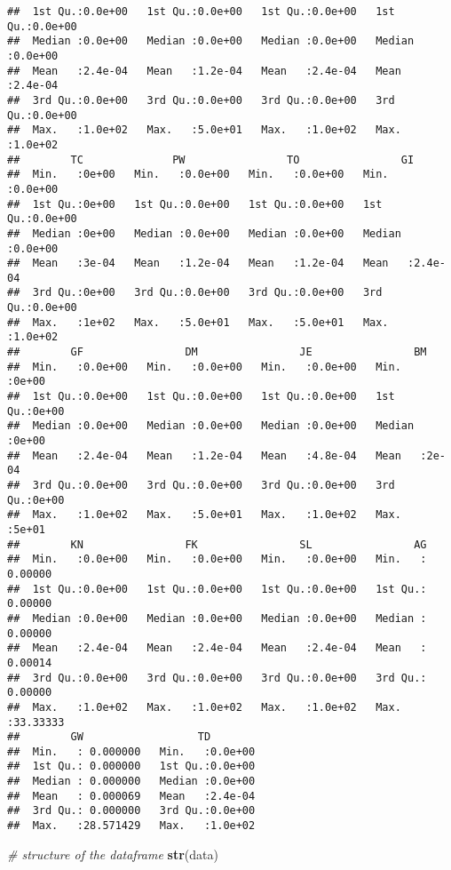 \documentclass[
]{article}
\newenvironment{Shaded}{\begin{snugshade}}{\end{snugshade}}
\newcommand{\CommentTok}[1]{\textcolor[rgb]{0.56,0.35,0.01}{\textit{#1}}}
\newcommand{\FunctionTok}[1]{\textcolor[rgb]{0.13,0.29,0.53}{\textbf{#1}}}
\newcommand{\NormalTok}[1]{#1}
\begin{document}
\begin{verbatim}
##  1st Qu.:0.0e+00   1st Qu.:0.0e+00   1st Qu.:0.0e+00   1st Qu.:0.0e+00  
##  Median :0.0e+00   Median :0.0e+00   Median :0.0e+00   Median :0.0e+00  
##  Mean   :2.4e-04   Mean   :1.2e-04   Mean   :2.4e-04   Mean   :2.4e-04  
##  3rd Qu.:0.0e+00   3rd Qu.:0.0e+00   3rd Qu.:0.0e+00   3rd Qu.:0.0e+00  
##  Max.   :1.0e+02   Max.   :5.0e+01   Max.   :1.0e+02   Max.   :1.0e+02  
##        TC              PW                TO                GI         
##  Min.   :0e+00   Min.   :0.0e+00   Min.   :0.0e+00   Min.   :0.0e+00  
##  1st Qu.:0e+00   1st Qu.:0.0e+00   1st Qu.:0.0e+00   1st Qu.:0.0e+00  
##  Median :0e+00   Median :0.0e+00   Median :0.0e+00   Median :0.0e+00  
##  Mean   :3e-04   Mean   :1.2e-04   Mean   :1.2e-04   Mean   :2.4e-04  
##  3rd Qu.:0e+00   3rd Qu.:0.0e+00   3rd Qu.:0.0e+00   3rd Qu.:0.0e+00  
##  Max.   :1e+02   Max.   :5.0e+01   Max.   :5.0e+01   Max.   :1.0e+02  
##        GF                DM                JE                BM       
##  Min.   :0.0e+00   Min.   :0.0e+00   Min.   :0.0e+00   Min.   :0e+00  
##  1st Qu.:0.0e+00   1st Qu.:0.0e+00   1st Qu.:0.0e+00   1st Qu.:0e+00  
##  Median :0.0e+00   Median :0.0e+00   Median :0.0e+00   Median :0e+00  
##  Mean   :2.4e-04   Mean   :1.2e-04   Mean   :4.8e-04   Mean   :2e-04  
##  3rd Qu.:0.0e+00   3rd Qu.:0.0e+00   3rd Qu.:0.0e+00   3rd Qu.:0e+00  
##  Max.   :1.0e+02   Max.   :5.0e+01   Max.   :1.0e+02   Max.   :5e+01  
##        KN                FK                SL                AG          
##  Min.   :0.0e+00   Min.   :0.0e+00   Min.   :0.0e+00   Min.   : 0.00000  
##  1st Qu.:0.0e+00   1st Qu.:0.0e+00   1st Qu.:0.0e+00   1st Qu.: 0.00000  
##  Median :0.0e+00   Median :0.0e+00   Median :0.0e+00   Median : 0.00000  
##  Mean   :2.4e-04   Mean   :2.4e-04   Mean   :2.4e-04   Mean   : 0.00014  
##  3rd Qu.:0.0e+00   3rd Qu.:0.0e+00   3rd Qu.:0.0e+00   3rd Qu.: 0.00000  
##  Max.   :1.0e+02   Max.   :1.0e+02   Max.   :1.0e+02   Max.   :33.33333  
##        GW                  TD         
##  Min.   : 0.000000   Min.   :0.0e+00  
##  1st Qu.: 0.000000   1st Qu.:0.0e+00  
##  Median : 0.000000   Median :0.0e+00  
##  Mean   : 0.000069   Mean   :2.4e-04  
##  3rd Qu.: 0.000000   3rd Qu.:0.0e+00  
##  Max.   :28.571429   Max.   :1.0e+02
\end{verbatim}

\begin{Shaded}
\begin{Highlighting}[]
\CommentTok{\# structure of the dataframe}
\FunctionTok{str}\NormalTok{(data)}
\end{Highlighting}
\end{Shaded}
\end{document}
